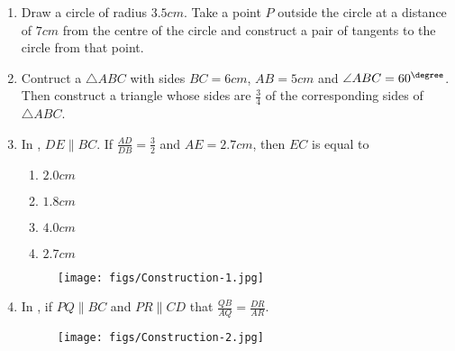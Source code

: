 \begin{enumerate}
	\item Draw a circle of radius $3.5 cm$. Take a point $P$ outside the circle at a distance of $7 cm$ from the centre of the circle and construct a pair of tangents to the circle from that point.
	\item Contruct a $\triangle ABC $ with sides $BC = 6 cm$, $AB = 5 cm$ and $\angle ABC = 60^\degree$. Then construct a triangle whose sides are $\frac{3}{4}$ of the corresponding sides of $\triangle ABC$.
	\item In , $DE \parallel BC $. If $\frac{AD}{DB}=\frac{3}{2}$ and $AE = 2.7 cm$, then $EC$ is equal to
		\begin{enumerate}
		\item $2.0 cm$ 
                \item $1.8 cm$
		\item $4.0 cm$
		\item $2.7 cm$
		\end{enumerate}
		\begin{figure}[!ht]
			\begin{center}
				\texttt{[image: figs/Construction-1.jpg]}
			\end{center}
			\caption{}
			\label{fig:Construction-1.jpg}
		\end{figure}
		\newpage
	\item In , if $PQ \parallel BC$ and $PR \parallel CD$ that $\frac{QB}{AQ} = \frac{DR}{AR}$.



		\begin{figure}[!ht]
			\begin{center}
				\texttt{[image: figs/Construction-2.jpg]}
			\end{center}
			\caption{}
			\label{fig:Construction-2.jpg}
		\end{figure}
\end{enumerate}

